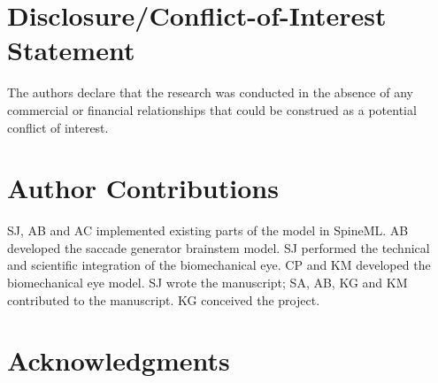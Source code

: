 \documentclass{frontiersSCNS}
\begin{document}


\section*{Disclosure/Conflict-of-Interest Statement}

The authors declare that the research was conducted in the absence of
any commercial or financial relationships that could be construed as a
potential conflict of interest.

\section*{Author Contributions}

SJ, AB and AC implemented existing parts of the model in SpineML. AB
developed the saccade generator brainstem model. SJ performed the
technical and scientific integration of the biomechanical eye.  CP and
KM developed the biomechanical eye model. SJ wrote the manuscript; SA,
AB, KG and KM contributed to the manuscript. KG conceived the
project.

\section*{Acknowledgments}
\end{document}
